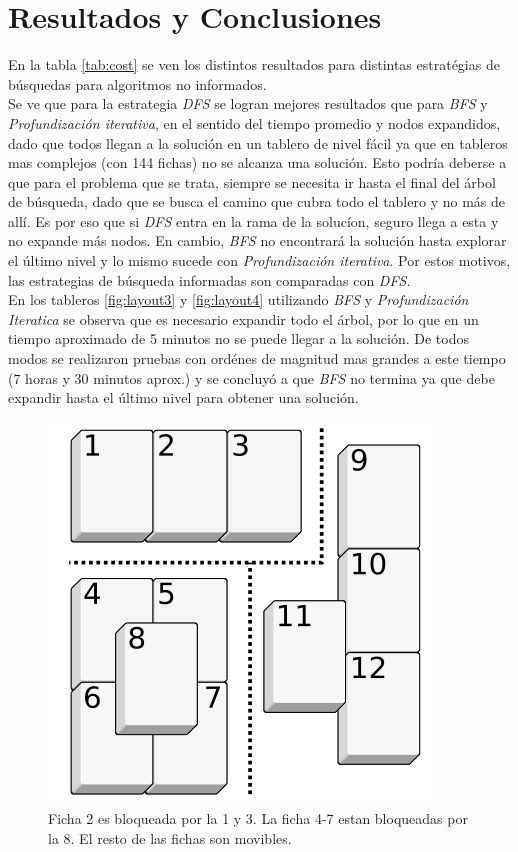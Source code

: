 \documentclass{sig-alternate}
\begin{document}
\section*{Resultados y Conclusiones}	
En la tabla \ref{tab:cost} se ven los distintos resultados para distintas estrat\'egias de b\'usquedas para algoritmos no informados. \\
Se ve que para la estrategia \emph{DFS} se logran mejores resultados que para \emph{BFS} y \emph{Profundizaci\'on iterativa}, en el sentido del tiempo promedio y nodos expandidos, dado que todos llegan a la soluci\'on en un tablero de nivel f\'acil ya que en tableros mas complejos (con 144 fichas) no se alcanza una soluci\'on. Esto podr\'ia deberse a que para el problema que se trata, siempre se necesita ir hasta el final del \'arbol de b\'usqueda, dado que se busca el camino que cubra todo el tablero y no m\'as de all\'i. Es por eso que si \emph{DFS} entra en la rama de la soluc\'ion, seguro llega a esta y no expande m\'as nodos. En cambio, \emph{BFS} no encontrar\'a la soluci\'on hasta explorar el \'ultimo nivel y lo mismo sucede con \emph{Profundizaci\'on iterativa}. Por estos motivos, las estrategias de b\'usqueda informadas son comparadas con \emph{DFS}. \\
En los tableros \ref{fig:layout3} y \ref{fig:layout4} utilizando \emph{BFS} y \emph{Profundizaci\'on Iteratica} se observa que es necesario expandir todo el \'arbol, por lo que en un tiempo aproximado de 5 minutos no se puede llegar a la soluci\'on. De todos modos se realizaron pruebas con ord\'enes de magnitud mas grandes a este tiempo (7 horas y 30 minutos aprox.) y se concluy\'o a que \emph{BFS} no termina ya que debe expandir hasta el \'ultimo nivel para obtener una soluci\'on.

\onecolumn

\begin{figure}[h!]
  \begin{center}
  	\includegraphics[scale=0.3]{images/blocking.png}
  \end{center}
  \caption{Ficha 2 es bloqueada por la 1 y 3. La ficha 4-7 estan bloqueadas por la 8. El resto de las fichas son movibles.}
  \label{fig:blocking}
\end{figure}
\end{document}
